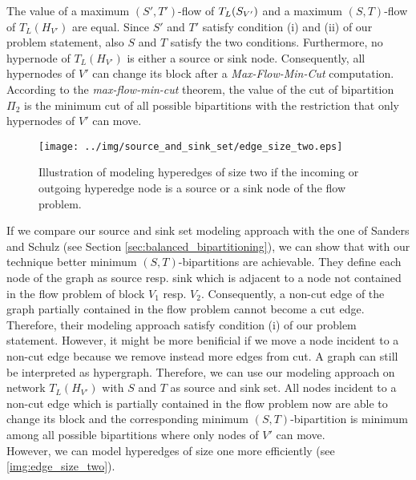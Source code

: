 The value of a maximum $(S',T')$-flow of $T_L(S_{V'})$ and a maximum $(S,T)$-flow
of $T_L(H_{V'})$ are equal. Since $S'$ and $T'$ satisfy condition (i) and (ii) of our 
problem statement, also $S$ and $T$ satisfy the two conditions. Furthermore, no hypernode
of $T_L(H_{V'})$ is either a source or sink node. Consequently, all hypernodes of $V'$
can change its block after a \emph{Max-Flow-Min-Cut} computation. According to the 
\emph{max-flow-min-cut} theorem, the value of the cut of bipartition $\Pi_2$ is the minimum
cut of all possible bipartitions with the restriction that only hypernodes of $V'$ can move.\\
\begin{figure}
\centering
\texttt{[image: ../img/source\_and\_sink\_set/edge\_size\_two.eps]}
\caption{Illustration of modeling hyperedges of size two if the incoming or outgoing
         hyperedge node is a source or a sink node of the flow problem.}
\label{img:edge_size_two}
\end{figure}
If we compare our source and sink set modeling approach with the one of Sanders and Schulz
\cite{sanders2011engineering} (see Section \ref{sec:balanced_bipartitioning}), we can show that
with our technique better minimum $(S,T)$-bipartitions are achievable. They define each node of the graph
as source resp. sink which is adjacent to a node not contained in the flow problem of block $V_1$
resp. $V_2$. Consequently, a non-cut edge of the graph partially contained in the flow problem
cannot become a cut edge. Therefore, their modeling approach satisfy condition (i) of our problem
statement. However, it might be more benificial if we move a node incident to a non-cut edge because
we remove instead more edges from cut. A graph can still be interpreted as hypergraph. Therefore,
we can use our modeling approach on network $T_L(H_{V'})$ with $S$ and $T$ as source and sink
set. 
All nodes incident to a non-cut edge which is partially contained in the flow problem
now are able to change its block and the corresponding minimum $(S,T)$-bipartition is minimum
among all possible bipartitions where only nodes of $V'$ can move. \\
However, we can model hyperedges of size one more efficiently (see \autoref{img:edge_size_two}).
